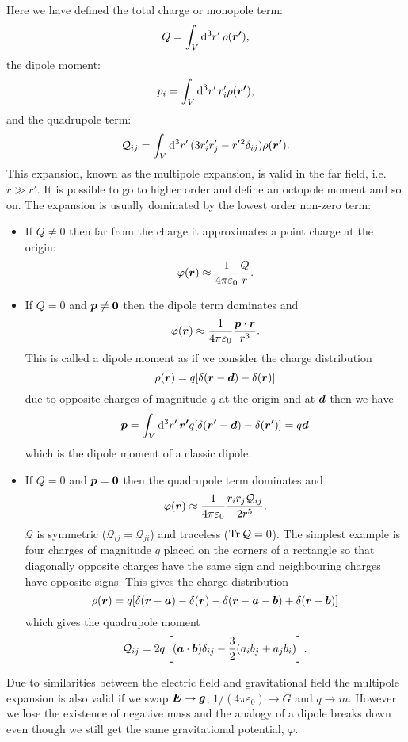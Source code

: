 \documentclass[a4paper]{article}
\begin{document}
    Here we have defined the total charge or monopole term:
    \[Q = \int_V\dd[3]{r'}\rho(\bm{r'}),\]
    the dipole moment:
    \[p_i = \int_V \dd[3]{r'} r'_i\rho(\bm{r'}),\]
    and the quadrupole term:
    \[\mathcal{Q}_{ij} = \int_V \dd[3]{r'} (3r'_ir'_j - r'{^2}\delta_{ij})\rho(\bm{r'}).\]
    This expansion, known as the multipole expansion, is valid in the far field, i.e. \(r \gg r'\).
    It is possible to go to higher order and define an octopole moment and so on.
    The expansion is usually dominated by the lowest order non-zero term:
    \begin{itemize}
        \item If \(Q \ne 0\) then far from the charge it approximates a point charge at the origin:
        \[\varphi(\bm{r}) \approx \frac{1}{4\pi\varepsilon_0}\frac{Q}{r}.\]
        
        \item If \(Q = 0\) and \(\bm{p}\ne \bm{0}\) then the dipole term dominates and
        \[\varphi(\bm{r}) \approx \frac{1}{4\pi\varepsilon_0}\frac{\bm{p}\cdot\bm{r}}{r^3}.\]
        This is called a dipole moment as if we consider the charge distribution
        \[\rho(\bm{r}) = q[\delta(\bm{r} - \bm{d}) - \delta(\bm{r})]\]
        due to opposite charges of magnitude \(q\) at the origin and at \(\bm{d}\) then we have
        \[\bm{p} = \int_V \dd[3]{r'} \bm{r'}q[\delta(\bm{r'} - \bm{d}) - \delta(\bm{r'})] = q\bm{d}\]
        which is the dipole moment of a classic dipole.
        
        \item If \(Q = 0\) and \(\bm{p} = \bm{0}\) then the quadrupole term dominates and
        \[\varphi(\bm{r}) \approx \frac{1}{4\pi\varepsilon_0} \frac{r_ir_j\mathcal{Q}_{ij}}{2r^5}.\]
        \(\mathcal{Q}\) is symmetric (\(\mathcal{Q}_{ij} = \mathcal{Q}_{ji}\)) and traceless (\(\Tr\mathcal{Q} = 0\)).
        The simplest example is four charges of magnitude \(q\) placed on the corners of a rectangle so that diagonally opposite charges have the same sign and neighbouring charges have opposite signs.
        This gives the charge distribution
        \[\rho(\bm{r}) = q[\delta(\bm{r} - \bm{a}) - \delta(\bm{r}) - \delta(\bm{r} - \bm{a} - \bm{b}) + \delta(\bm{r} - \bm{b})]\]
        which gives the quadrupole moment
        \[\mathcal{Q}_{ij} = 2q\left[(\bm{a}\cdot\bm{b})\delta_{ij} - \frac{3}{2}(a_ib_j + a_jb_i)\right].\]
    \end{itemize}
    Due to similarities between the electric field and gravitational field the multipole expansion is also valid if we swap \(\bm{E} \to\bm{g}\), \(1/(4\pi\varepsilon_0) \to G\) and \(q\to m\).
    However we lose the existence of negative mass and the analogy of a dipole breaks down even though we still get the same gravitational potential, \(\varphi\).
    \clearpage
    \appendix
\end{document}
